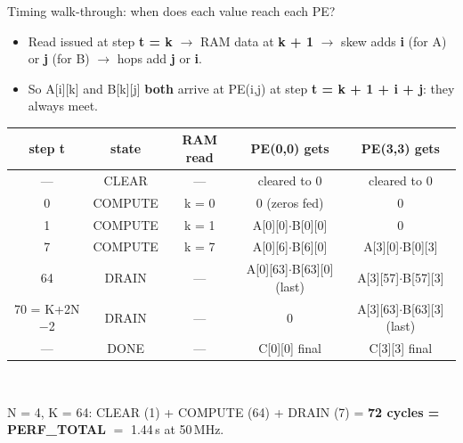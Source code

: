 \documentclass[aspectratio=169,11pt]{beamer}
\begin{document}
\begin{frame}{Timing walk-through: when does each value reach each PE?}
  \small
  \begin{itemize}
    \item Read issued at step \textbf{t = k} $\to$ RAM data at \textbf{k + 1}
          $\to$ skew adds \textbf{i} (for A) or \textbf{j} (for B) $\to$ hops add \textbf{j} or \textbf{i}.
    \item So A[i][k] and B[k][j] \textbf{both} arrive at PE(i,j) at step
          \alert{\textbf{t = k + 1 + i + j}}: they always meet.
  \end{itemize}
  \vspace{1mm}
  \centering\scriptsize
  \begin{tabular}{@{}c c c c c@{}}
    \toprule
    \textbf{step t} & \textbf{state} & \textbf{RAM read} & \textbf{PE(0,0) gets} & \textbf{PE(3,3) gets} \\
    \midrule
    --- & CLEAR & --- & cleared to 0 & cleared to 0 \\
    0 & COMPUTE & k = 0 & 0 (zeros fed) & 0 \\
    1 & COMPUTE & k = 1 & A[0][0]$\cdot$B[0][0] & 0 \\
    7 & COMPUTE & k = 7 & A[0][6]$\cdot$B[6][0] & A[3][0]$\cdot$B[0][3] \\
    64 & DRAIN & --- & A[0][63]$\cdot$B[63][0] (last) & A[3][57]$\cdot$B[57][3] \\
    70 = K+2N$-$2 & DRAIN & --- & 0 & A[3][63]$\cdot$B[63][3] (last) \\
    --- & DONE & --- & C[0][0] final & C[3][3] final \\
    \bottomrule
  \end{tabular}\\[2mm]
  \raggedright\footnotesize
  N = 4, K = 64: CLEAR (1) + COMPUTE (64) + DRAIN (7) = \textbf{72 cycles = PERF\_TOTAL} $=$ 1.44\,\textmu s at 50\,MHz.
\end{frame}
\end{document}
